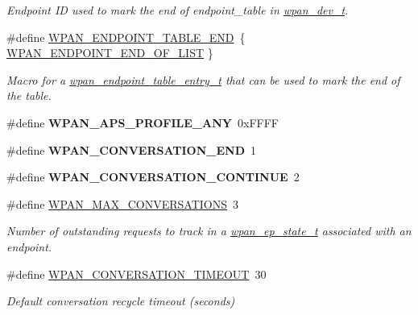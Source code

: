 \begin{DoxyCompactItemize}
\begin{DoxyCompactList}\small\item\em Endpoint I\-D used to mark the end of {\ttfamily endpoint\-\_\-table} in \hyperlink{structwpan__dev__t}{wpan\-\_\-dev\-\_\-t}. \end{DoxyCompactList}\item 
\#define \hyperlink{group__wpan__aps_gaac571cafa96f8201c714feb0634afa92}{W\-P\-A\-N\-\_\-\-E\-N\-D\-P\-O\-I\-N\-T\-\_\-\-T\-A\-B\-L\-E\-\_\-\-E\-N\-D}~\{ \hyperlink{group__wpan__aps_ga0ca55f0e8039df7fba03c041e4cf5a79}{W\-P\-A\-N\-\_\-\-E\-N\-D\-P\-O\-I\-N\-T\-\_\-\-E\-N\-D\-\_\-\-O\-F\-\_\-\-L\-I\-S\-T} \}
\begin{DoxyCompactList}\small\item\em Macro for a \hyperlink{structwpan__endpoint__table__entry__t}{wpan\-\_\-endpoint\-\_\-table\-\_\-entry\-\_\-t} that can be used to mark the end of the table. \end{DoxyCompactList}\item 
\hypertarget{group__wpan__aps_ga05c007913497e9a6286b7b2cdcb3f37f}{\#define {\bfseries W\-P\-A\-N\-\_\-\-A\-P\-S\-\_\-\-P\-R\-O\-F\-I\-L\-E\-\_\-\-A\-N\-Y}~0x\-F\-F\-F\-F}\label{group__wpan__aps_ga05c007913497e9a6286b7b2cdcb3f37f}

\item 
\hypertarget{group__wpan__aps_ga7f0128cee60f97e9f07bc95df3a0a1f1}{\#define {\bfseries W\-P\-A\-N\-\_\-\-C\-O\-N\-V\-E\-R\-S\-A\-T\-I\-O\-N\-\_\-\-E\-N\-D}~1}\label{group__wpan__aps_ga7f0128cee60f97e9f07bc95df3a0a1f1}

\item 
\hypertarget{group__wpan__aps_gaef235cbd4d3160abe5f856d86ad70555}{\#define {\bfseries W\-P\-A\-N\-\_\-\-C\-O\-N\-V\-E\-R\-S\-A\-T\-I\-O\-N\-\_\-\-C\-O\-N\-T\-I\-N\-U\-E}~2}\label{group__wpan__aps_gaef235cbd4d3160abe5f856d86ad70555}

\item 
\#define \hyperlink{group__wpan__aps_gae34b1efc8ba99add17fcd767852197d4}{W\-P\-A\-N\-\_\-\-M\-A\-X\-\_\-\-C\-O\-N\-V\-E\-R\-S\-A\-T\-I\-O\-N\-S}~3
\begin{DoxyCompactList}\small\item\em Number of outstanding requests to track in a \hyperlink{structwpan__ep__state__t}{wpan\-\_\-ep\-\_\-state\-\_\-t} associated with an endpoint. \end{DoxyCompactList}\item 
\hypertarget{group__wpan__aps_gaaa330f432d7a6bccdb393a656ddfe4d3}{\#define \hyperlink{group__wpan__aps_gaaa330f432d7a6bccdb393a656ddfe4d3}{W\-P\-A\-N\-\_\-\-C\-O\-N\-V\-E\-R\-S\-A\-T\-I\-O\-N\-\_\-\-T\-I\-M\-E\-O\-U\-T}~30}\label{group__wpan__aps_gaaa330f432d7a6bccdb393a656ddfe4d3}

\begin{DoxyCompactList}\small\item\em Default conversation recycle timeout (seconds) \end{DoxyCompactList}\end{DoxyCompactItemize}
